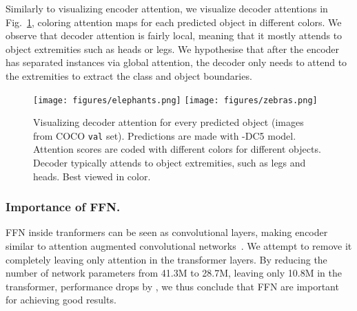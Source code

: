 Similarly to visualizing encoder attention,
we visualize decoder attentions in Fig.~\ref{fig:attention_maps},
coloring attention maps for each predicted object in different colors.
We observe that decoder attention is fairly local, meaning that it mostly attends to object extremities such as heads or legs.
We hypothesise that after the encoder has separated instances via
global attention, the decoder only needs to attend to the extremities to extract the class and object boundaries.

\begin{figure}[t]
    \centering\small
    \texttt{[image: figures/elephants.png]}
    \texttt{[image: figures/zebras.png]}
    \caption{Visualizing decoder attention for every predicted object
    (images from COCO \texttt{val} set).
    Predictions are made with \detr-DC5 model.
    Attention scores are coded with different colors for different objects.
    Decoder typically attends to object extremities,
    such as legs and heads.
    Best viewed in color.
    }
    \label{fig:attention_maps}
\end{figure}



\subsubsection{Importance of FFN.}
FFN inside tranformers can be seen as  convolutional layers,
making encoder similar to
attention augmented convolutional networks~\cite{Bello2019AttentionAC}.
We attempt to remove it completely leaving only attention in the transformer layers.
By reducing the number of network parameters from 41.3M to 28.7M,
leaving only 10.8M in the transformer, performance drops by , we thus conclude that FFN are important for achieving good results.

